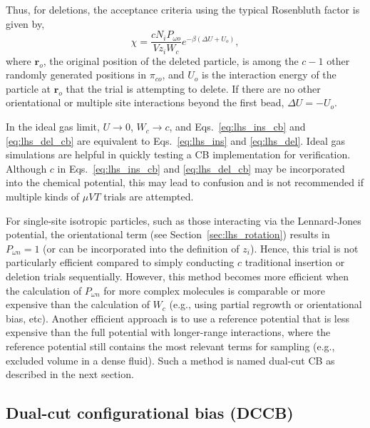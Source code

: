 \documentclass[
  9pt,
  bestpractices,
]{livecoms}
\begin{document}
Thus, for deletions, the acceptance criteria using the typical Rosenbluth factor is given by,
\begin{equation}
\chi = \frac{c N_i P_{\omega o}}{Vz_i W_{c}}e^{-\beta(\Delta U + U_o)},
\label{eq:lhs_del_cb}
\end{equation}
where $\mathbf{r}_o$, the original position of the deleted particle, is among the ${c}-1$ other randomly generated positions in $\pi_{co}$, and $U_o$ is the interaction energy of the particle at $\mathbf{r}_o$ that the trial is attempting to delete.
If there are no other orientational or multiple site interactions beyond the first bead, $\Delta U = - U_o$.

In the ideal gas limit, $U\rightarrow 0$, $W_{c}\rightarrow{c}$, and Eqs.~\ref{eq:lhs_ins_cb} and \ref{eq:lhs_del_cb} are equivalent to Eqs.~\ref{eq:lhs_ins} and \ref{eq:lhs_del}.
Ideal gas simulations are helpful in quickly testing a CB implementation for verification.
Although ${c}$ in Eqs.~\ref{eq:lhs_ins_cb} and \ref{eq:lhs_del_cb} may be incorporated into the chemical potential, this may lead to confusion and is not recommended if multiple kinds of $\mu VT$ trials are attempted.

For single-site isotropic particles, such as those interacting via the Lennard-Jones potential, the orientational term (see Section~\ref{sec:lhs_rotation}) results in $P_{\omega n} = 1$ (or can be incorporated into the definition of $z_i$).
Hence, this trial is not particularly efficient compared to simply conducting $c$ traditional insertion or deletion trials sequentially.
However, this method becomes more efficient when the calculation of $P_{\omega n}$ for more complex molecules is comparable or more expensive than the calculation of $W_{c}$ (e.g., using partial regrowth or orientational bias, etc).
Another efficient approach is to use a reference potential that is less expensive than the full potential with longer-range interactions, where the reference potential still contains the most relevant terms for sampling (e.g., excluded volume in a dense fluid).
Such a method is named dual-cut CB \cite{vlugt_improving_1998} as described in the next section.

\subsection{\label{sec:lhs_insdel_dccb}Dual-cut configurational bias (DCCB)}
\end{document}

